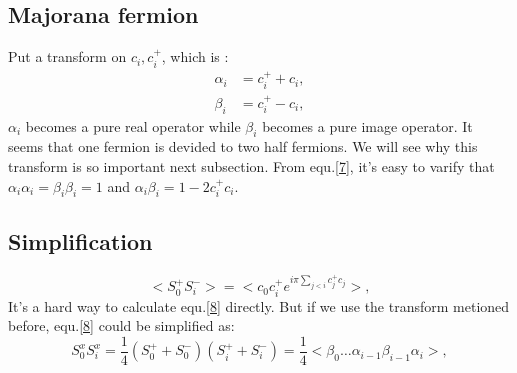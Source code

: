 \documentclass[UTF8]{ctexart}
\begin{document}
\subsection{Majorana fermion}
Put a transform on ${c_i,c_i^+}$, which is :
\begin{subequations}
\begin{align}
\alpha_i&=c_i^++c_i,\\
\beta_i&=c_i^+-c_i,
\label{7}
\end{align}
\end{subequations}
$\alpha_i$ becomes a pure real operator while $\beta_i$ becomes a pure image operator. It seems that one fermion is devided to two half fermions. We will see why this transform is so important next subsection. From equ.\ref{7}, it's easy to varify that $\alpha_i\alpha_i=\beta_i\beta_i=1$ and $\alpha_i\beta_i=1-2c_i^+c_i$.
\subsection{Simplification}
\begin{equation}
\label{8}
<S_0^+S_i^->=<c_0c_i^+e^{i\pi\sum_{j<i}c_j^+c_j}>,
\end{equation}
It's a hard way to calculate equ.\ref{8} directly. But if we use the transform metioned before, equ.\ref{8} could be simplified as:
\begin{equation}
\label{9}
S_0^xS_i^x=\frac{1}{4}(S_0^++S_0^-)(S_i^++S_i^-)=\frac{1}{4}<\beta_0\ldots\alpha_{i-1}\beta_{i-1}\alpha_i>,
\end{equation}
\end{document}
